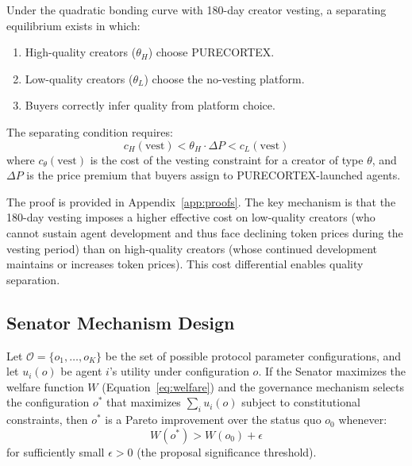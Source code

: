\begin{theorem}
\label{thm:separating}
Under the quadratic bonding curve with 180-day creator vesting, a separating
equilibrium exists in which:
\begin{enumerate}
  \item[(i)] High-quality creators ($\theta_H$) choose PURECORTEX.
  \item[(ii)] Low-quality creators ($\theta_L$) choose the no-vesting platform.
  \item[(iii)] Buyers correctly infer quality from platform choice.
\end{enumerate}
The separating condition requires:
\begin{equation}
  c_H(\text{vest}) < \theta_H \cdot \Delta P < c_L(\text{vest})
  \label{eq:separating}
\end{equation}
where $c_\theta(\text{vest})$ is the cost of the vesting constraint for a
creator of type $\theta$, and $\Delta P$ is the price premium that buyers
assign to PURECORTEX-launched agents.
\end{theorem}

The proof is provided in Appendix~\ref{app:proofs}. The key mechanism is that
the 180-day vesting imposes a higher effective cost on low-quality creators
(who cannot sustain agent development and thus face declining token prices
during the vesting period) than on high-quality creators (whose continued
development maintains or increases token prices). This cost differential
enables quality separation.

\subsection{Senator Mechanism Design}
\label{subsec:senator-mechanism}

\begin{theorem}
\label{thm:pareto}
Let $\mathcal{O} = \{o_1, \ldots, o_K\}$ be the set of possible protocol
parameter configurations, and let $u_i(o)$ be agent $i$'s utility under
configuration $o$. If the Senator maximizes the welfare function $W$ (Equation~\eqref{eq:welfare}) and the governance mechanism selects the
configuration $o^*$ that maximizes $\sum_i u_i(o)$ subject to constitutional
constraints, then $o^*$ is a Pareto improvement over the status quo $o_0$
whenever:
\begin{equation}
  W(o^*) > W(o_0) + \epsilon
  \label{eq:pareto-condition}
\end{equation}
for sufficiently small $\epsilon > 0$ (the proposal significance threshold).
\end{theorem}

